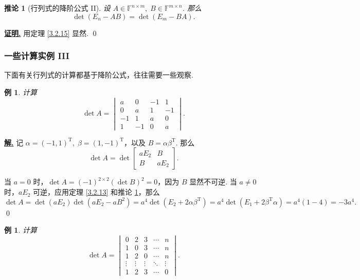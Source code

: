 \documentclass[10pt,openany]{article}
\theoremstyle{thmstyle} %
\theoremstyle{defstyle} %
\newtheorem{corollary}[theorem]{推论}
\theoremstyle{prostyle} %
\theoremstyle{exastyle}
\newtheorem{example}[theorem]{例}
\theoremstyle{remstyle}
\renewenvironment{proof}[1][证明]{\par\underline{\textbf{#1.}} \;\fangsong}{\qed\par}
\newenvironment{solution}{\par\underline{\textbf{解.}} \;\fangsong}{\qed\par}
\newcommand{\T}{^{\text{T}}}
\newcommand{\F}{\mathbb{F}}
\newcommand{\mn}{^{m \times n}}
\newcommand{\nm}{^{n \times m}}
\begin{document}
\begin{corollary}[行列式的降阶公式 II] \label{3.2.16}
	设 \( A \in \F\nm, \; B \in \F\mn \). 那么
	\[ \det(E_n - AB)= \det(E_m - BA). \]
\end{corollary}

\begin{proof}
	用定理 \ref{3.2.15} 显然.
\end{proof}

\subsubsection{一些计算实例 III}

下面有关行列式的计算都基于降阶公式，往往需要一些观察.

\begin{example}
	计算
	\[ \det A= \begin{vmatrix}
		a & 0 & -1 & 1 \\
		0 & a & 1 & -1 \\
		-1 & 1 & a & 0 \\
		1 & -1 & 0 & a
	\end{vmatrix}. \]
\end{example}

\begin{solution}
	记 \( \alpha=(-1,1)\T, \; \beta=(1,-1)\T \)，以及 \( B=\alpha\beta\T \). 那么
	\[ \det A=\det \begin{bmatrix}
		aE_2 & B \\ B & aE_2
	\end{bmatrix}. \]
	
	当 \( a=0 \) 时，\( \det A= (-1)^{2 \times 2} (\det B)^2=0 \)，因为 \( B \) 显然不可逆. 当 \( a \neq 0 \) 时，\( aE_2 \) 可逆，应用定理 \ref{3.2.13} 和推论 \ref{3.2.16}，那么
	\[ \det A= \det (aE_2) \det(aE_2-aB^2)= a^4 \det (E_2+2\alpha\beta\T)= a^4 \det(E_1+2\beta\T \alpha)= a^4(1-4)=-3a^4. \]
\end{solution}


\begin{example}
	计算
	\[ \det A= \begin{vmatrix}
		0 & 2 & 3 & \cdots & n \\
		1 & 0 & 3 & \cdots & n \\
		1 & 2 & 0 & \cdots & n \\
		\vdots & \vdots & \vdots & \ddots & \vdots \\
		1 & 2 & 3 & \cdots & 0
	\end{vmatrix}. \]
\end{example}
\end{document}
